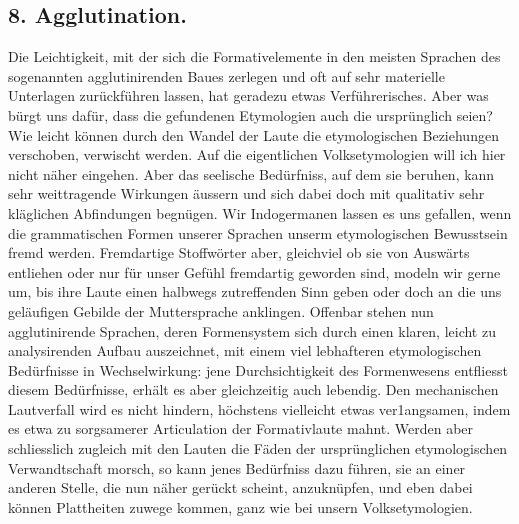 \subsection*{8. Agglutination.}\label{IV.IV.8}

Die Leichtigkeit, mit der sich die Formativelemente in den meisten Sprachen des sogenannten agglutinirenden Baues zerlegen und oft auf sehr materielle Unterlagen zurückführen lassen, hat geradezu etwas Verführerisches. Aber was bürgt uns dafür, dass die gefundenen Etymologien auch die ursprünglich  seien? Wie leicht können durch den Wandel der Laute die etymologischen Beziehungen verschoben, verwischt werden. Auf die eigentlichen Volksetymologien will ich hier nicht näher eingehen. Aber das seelische Bedürfniss, auf dem sie beruhen, kann sehr weittragende Wirkungen äussern und sich dabei doch mit qualitativ sehr kläglichen Abfindungen begnügen. Wir Indogermanen lassen es uns gefallen, wenn die grammatischen Formen unserer Sprachen unserm etymologischen Bewusstsein fremd werden. Fremdartige Stoff\label{fp.384}wörter aber, gleichviel ob sie von Auswärts entliehen oder nur für unser Gefühl fremdartig geworden sind, modeln wir gerne um, bis ihre Laute einen halbwegs zutreffenden Sinn geben oder doch an die uns geläufigen Gebilde der Muttersprache anklingen. Offenbar stehen nun agglutinirende Sprachen, deren Formensystem sich durch einen klaren, leicht zu analysirenden Aufbau auszeichnet, mit einem viel lebhafteren etymologischen Bedürfnisse in Wechselwirkung: jene Durchsichtigkeit des Formenwesens entfliesst diesem Bedürfnisse, erhält es aber gleichzeitig auch lebendig. Den mechanischen Lautverfall wird es nicht hindern, höchstens vielleicht etwas ver1angsamen, indem es etwa zu sorgsamerer Articulation der Formativlaute mahnt. Werden aber schliesslich zugleich mit den Lauten die Fäden der ursprünglichen etymologischen Verwandtschaft morsch, so kann jenes Bedürfniss dazu führen, sie an einer anderen Stelle, die nun näher gerückt scheint, anzuknüpfen, und eben dabei können Plattheiten zuwege kommen, ganz wie bei unsern Volksetymologien.

